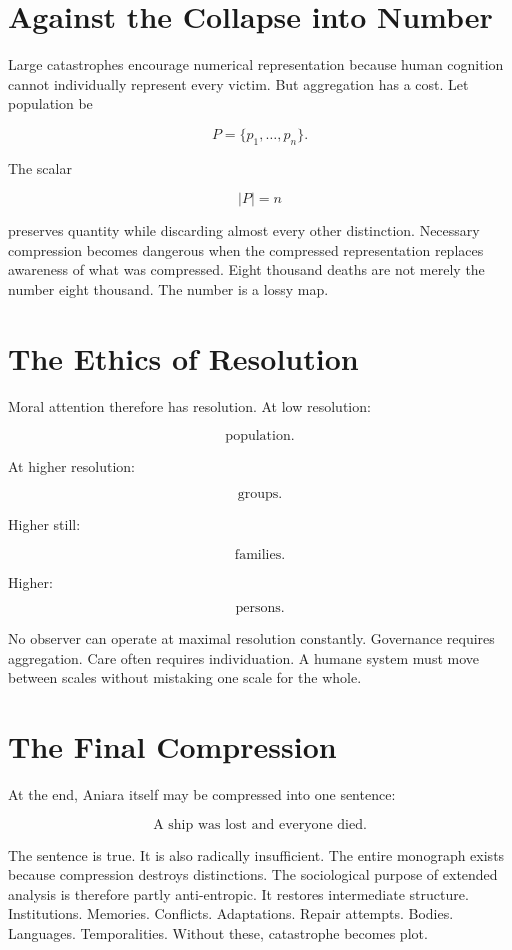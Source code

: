 \documentclass[11pt,oneside]{book}
\theoremstyle{definition}
\theoremstyle{remark}
\begin{document}
\section{Against the Collapse into Number}

Large catastrophes encourage numerical representation because human cognition cannot individually
represent every victim. But aggregation has a cost. Let population be

\[
P=\{p_1,\ldots,p_n\}.
\]

The scalar

\[
|P|=n
\]

preserves quantity while discarding almost every other distinction. Necessary compression becomes
dangerous when the compressed representation replaces awareness of what was compressed. Eight
thousand deaths are not merely the number eight thousand. The number is a lossy map.

\section{The Ethics of Resolution}

Moral attention therefore has resolution. At low resolution:

\[
\text{population}.
\]

At higher resolution:

\[
\text{groups}.
\]

Higher still:

\[
\text{families}.
\]

Higher:

\[
\text{persons}.
\]

No observer can operate at maximal resolution constantly. Governance requires aggregation. Care
often requires individuation. A humane system must move between scales without mistaking one scale
for the whole.

\section{The Final Compression}

At the end, Aniara itself may be compressed into one sentence:

\[
\text{A ship was lost and everyone died.}
\]

The sentence is true. It is also radically insufficient. The entire monograph exists because
compression destroys distinctions. The sociological purpose of extended analysis is therefore partly
anti-entropic. It restores intermediate structure. Institutions. Memories. Conflicts. Adaptations.
Repair attempts. Bodies. Languages. Temporalities. Without these, catastrophe becomes plot.
\end{document}
